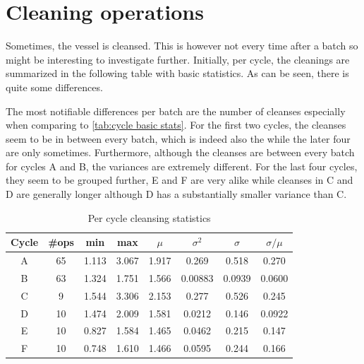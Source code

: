 \documentclass[../Thesis.tex]{subfiles}
\begin{document}


\newpage
\section{Cleaning operations}
Sometimes, the vessel is cleansed. This is however not every time after a batch so might be interesting to investigate further. Initially, per cycle, the cleanings are summarized in the following table with basic statistics. As can be seen, there is quite some differences.

The most notifiable differences per batch are the number of cleanses especially when comparing to \autoref{tab:cycle basic stats}. For the first two cycles, the cleanses seem to be in between every batch, which is indeed also the while the later four are only sometimes. Furthermore, although the cleanses are between every batch for cycles A and B, the variances are extremely different. For the last four cycles, they seem to be grouped further, E and F are very alike while cleanses in C and D are generally longer although D has a substantially smaller variance than C.

\begin{table}[h]
    \centering
    \begin{tabular}{c|c|c|c|c|c|c|c}
        Cycle & \#ops & min   & max   & $\mu$ & $\sigma^2$ & $\sigma$ & $\sigma / \mu$ \\ \hline
        A     & 65    & 1.113 & 3.067 & 1.917 & 0.269      & 0.518    & 0.270          \\
        B     & 63    & 1.324 & 1.751 & 1.566 & 0.00883    & 0.0939   & 0.0600         \\
        C     & 9     & 1.544 & 3.306 & 2.153 & 0.277      & 0.526    & 0.245          \\
        D     & 10    & 1.474 & 2.009 & 1.581 & 0.0212     & 0.146    & 0.0922         \\
        E     & 10    & 0.827 & 1.584 & 1.465 & 0.0462     & 0.215    & 0.147          \\
        F     & 10    & 0.748 & 1.610 & 1.466 & 0.0595     & 0.244    & 0.166
    \end{tabular}
    \caption{Per cycle cleansing statistics}
    \label{tab:cycle cleansing stats stats}
\end{table}
\end{document}
